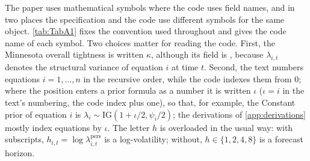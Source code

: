 The paper uses mathematical symbols where the code uses field names, and in two places the
specification and the code use different symbols for the same object.
\cref{tab:TabA1} fixes the convention used throughout and gives the code name of each symbol.
Two choices matter for reading the code.
First, the Minnesota overall tightness is written $\kappa$, although its field is
, because $\lambda_{i,t}$ denotes the structural variance of equation $i$ at
time $t$.
Second, the text numbers equations $i = 1, \dots, n$ in the recursive order, while the code
indexes them from $0$; where the position enters a prior formula as a number it is written $\iota$
($\iota = i$ in the text's numbering, the code index plus one), so that, for example, the Constant
prior of equation $i$ is $\lambda_i \sim \mathrm{IG}(1 + \iota/2, \psi_i/2)$; the derivations of
\cref{app:derivations} mostly index equations by $\iota$.
The letter $h$ is overloaded in the usual way: with subscripts, $h_{i,t} = \log
\lambda^{\mathrm{pers}}_{i,t}$ is a log-volatility; without, $h \in \{1, 2, 4, 8\}$ is a forecast
horizon.

